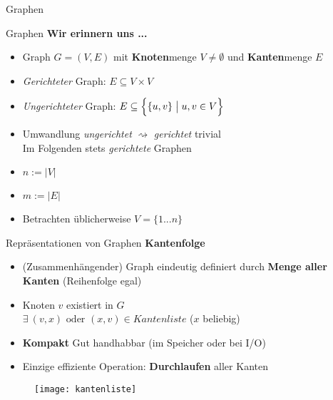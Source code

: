 





	
	
\begin{headframe}
	Graphen
\end{headframe}
	
\begin{frame}{Graphen}
	\textbf{Wir erinnern uns ...} 
	\begin{itemize}
		\item Graph $G = (V, E)$ mit \textbf{Knoten}menge $V \neq \emptyset$ und \textbf{Kanten}menge $E$
		\pause
		\item \emph{Gerichteter} Graph: $E \subseteq V \times V$
		\item \emph{Ungerichteter} Graph: $E \subseteq \Big\lbrace \{u, v\} \bigm| u, v \in V \Big\rbrace$
		\pause
		\item Umwandlung \textit{ungerichtet} $\rightsquigarrow$ \textit{gerichtet} trivial \\ 
		\impl Im Folgenden stets \emph{gerichtete} Graphen
		\pause
		\item $n := |V|$
		\item $m := |E|$
		\pause
		\item Betrachten üblicherweise $V = \{1...n\}$ 
	\end{itemize}
\end{frame}

\begin{frame}{Repräsentationen von Graphen}
	\textbf{Kantenfolge} \\[0,125cm]
	\begin{itemize}
		\item {\small (Zusammenhängender)} Graph eindeutig definiert durch \textbf{Menge aller Kanten} (Reihenfolge egal)
		\pause
		\item Knoten $v$ existiert in $G$ \\ 
		\gdw $\exists\ (v, x) \text{ oder } (x, v) \in \textit{Kantenliste}$ \quad ($x$ beliebig)
		\pause
		\item[\Pros] \textbf{Kompakt} \impl Gut handhabbar (im Speicher oder bei I/O)
		\pause
		\item[\Cons] Einzige effiziente Operation: \textbf{Durchlaufen} aller Kanten
	\end{itemize}
	\begin{figure}[htp]
		\centering
		\texttt{[image: kantenliste]}
	\end{figure}
\end{frame}

